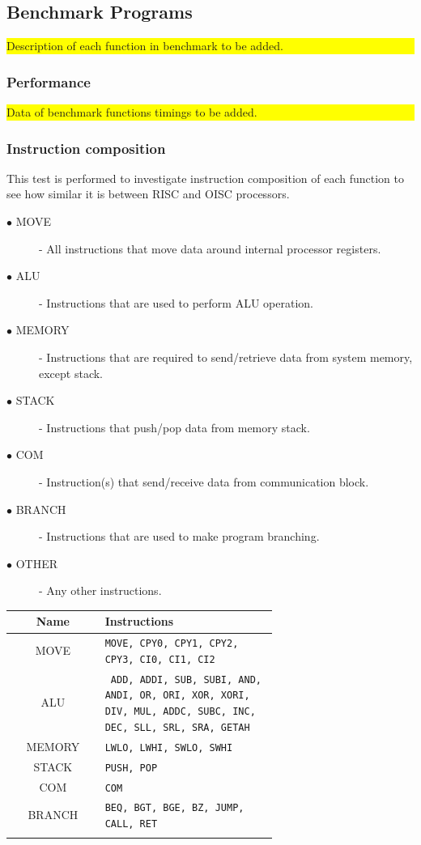\subsection{Benchmark Programs}

\colorbox{yellow}{\parbox{\columnwidth}{Description of each function in benchmark to be added.}}

\subsubsection{Performance}
\colorbox{yellow}{\parbox{\columnwidth}{Data of benchmark functions timings to be added.}}

\subsubsection{Instruction composition}
This test is performed to investigate instruction composition of each function to see how similar it is between RISC and OISC processors. 
\begin{description}
	\item[$\bullet$ MOVE] - All instructions that move data around internal processor registers.
	\item[$\bullet$ ALU] - Instructions that are used to perform ALU operation.
	\item[$\bullet$ MEMORY] - Instructions that are required to send/retrieve data from system memory, except stack.
	\item[$\bullet$ STACK] - Instructions that push/pop data from memory stack.
	\item[$\bullet$ COM] - Instruction(s) that send/receive data from communication block.
	\item[$\bullet$ BRANCH] - Instructions that are used to make program branching.
	\item[$\bullet$ OTHER] - Any other instructions.
\end{description}

\begin{blockpage}
	\begin{tabular}{| c | p{0.65\linewidth} |} \hline 
		\rowcolor[rgb]{0.82,0.82,0.82}
		Name & Instructions \\\hline
		MOVE & \texttt{MOVE, CPY0, CPY1, CPY2, CPY3, CI0, CI1, CI2} \\\hline
		ALU & \texttt{%
			ADD, ADDI,
			SUB, SUBI,
			AND, ANDI,
			OR, ORI,
			XOR, XORI,
			DIV, MUL,
			ADDC, SUBC,
			INC, DEC,
			SLL, SRL, 
			SRA, GETAH
		} \\\hline
		MEMORY & \texttt{LWLO, LWHI, SWLO, SWHI} \\\hline
		STACK  & \texttt{PUSH, POP} \\\hline
		COM & \texttt{COM} \\\hline
		BRANCH & \texttt{BEQ, BGT, BGE, BZ, JUMP, CALL, RET} \\\hline
		\arrayrulecolor[rgb]{0,0,0}\hline
	\end{tabular}
	\label{tab:instr_groups_risc}
\end{blockpage}

